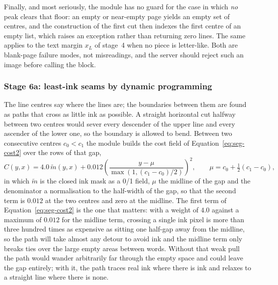 Finally, and most seriously, the module has no guard for the case in which \emph{no} peak clears that floor: an empty or near-empty page yields an empty set of centres, and the construction of the first cut then indexes the first centre of an empty list, which raises an exception rather than returning zero lines.
The same applies to the text margin $x_L$ of stage~4 when no piece is letter-like.
Both are blank-page failure modes, not misreadings, and the server should reject such an image before calling the block.

\subsubsection{Stage 6a: least-ink seams by dynamic programming}

The line centres say where the lines are; the boundaries between them are found as paths that cross as little ink as possible.
A straight horizontal cut halfway between two centres would sever every descender of the upper line and every ascender of the lower one, so the boundary is allowed to bend.
Between two consecutive centres $c_0<c_1$ the module builds the cost field of Equation~\ref{eq:seg-cost2} over the rows of that gap,
\begin{equation}
C(y,x)=4.0\,\tilde m(y,x)+0.012\left(\frac{y-\mu}{\max(1,(c_1-c_0)/2)}\right)^{\!2},\qquad \mu=c_0+\tfrac12(c_1-c_0),
\label{eq:seg-cost2}
\end{equation}
in which $\tilde m$ is the closed ink mask as a 0/1 field, $\mu$ the midline of the gap and the denominator a normalisation to the half-width of the gap, so that the second term is $0.012$ at the two centres and zero at the midline.
The first term of Equation~\ref{eq:seg-cost2} is the one that matters: with a weight of $4.0$ against a maximum of $0.012$ for the midline term, crossing a single ink pixel is more than three hundred times as expensive as sitting one half-gap away from the midline, so the path will take almost any detour to avoid ink and the midline term only breaks ties over the large empty areas between words.
Without that weak pull the path would wander arbitrarily far through the empty space and could leave the gap entirely; with it, the path traces real ink where there is ink and relaxes to a straight line where there is none.

